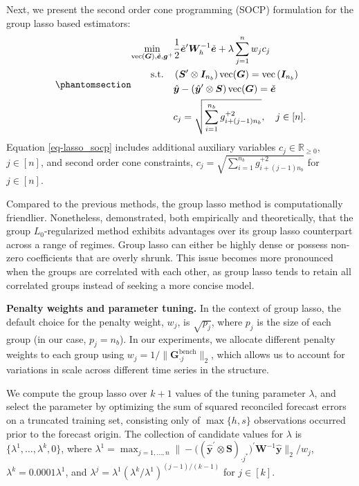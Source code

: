 \documentclass[
  11pt]{article}
\theoremstyle{plain}
\theoremstyle{remark}
\begin{document}
Next, we present the second order cone programming (SOCP) formulation
for the group lasso based estimators:
\begin{equation}\phantomsection\label{eq-lasso_socp}{
\begin{aligned}
\min_{\operatorname{vec}(\bm{G}), \check{\bm{e}}, \bm{g}^{+}} & \frac{1}{2}\check{\bm{e}}^{\prime} \bm{W}_h^{-1}\check{\bm{e}} + \lambda \sum_{j=1}^n w_j c_j \\
\text{s.t.} \quad & \left(\bm{S}^{\prime} \otimes \bm{I}_{n_b}\right) \operatorname{vec}(\bm{G})=\operatorname{vec}\left(\bm{I}_{n_b}\right) \\
& \hat{\bm{y}}-\left(\hat{\bm{y}}^{\prime} \otimes \bm{S}\right) \operatorname{vec}(\bm{G}) = \check{\bm{e}} \\
& c_j = \sqrt{\sum_{i=1}^{n_b} g_{i + (j-1) n_b}^{+2}}, \quad j \in[n].
\end{aligned}
}\end{equation} Equation \eqref{eq-lasso_socp} includes additional
auxiliary variables \(c_j \in \mathbb{R}_{\geq 0}\), \(j \in [n]\), and
second order cone constraints,
\(c_j = \sqrt{\sum_{i=1}^{n_b} g_{i + (j-1) n_b}^{+2}}\) for
\(j \in[n]\).

Compared to the previous methods, the group lasso method is
computationally friendlier. Nonetheless, \citet{Hazimeh2023-ie}
demonstrated, both empirically and theoretically, that the group
\(L_0\)-regularized method exhibits advantages over its group lasso
counterpart across a range of regimes. Group lasso can either be highly
dense or possess non-zero coefficients that are overly shrunk. This
issue becomes more pronounced when the groups are correlated with each
other, as group lasso tends to retain all correlated groups instead of
seeking a more concise model.

\textbf{Penalty weights and parameter tuning.} In the context of group
lasso, the default choice for the penalty weight, \(w_j\), is
\(\sqrt{p_j}\), where \(p_j\) is the size of each group (in our case,
\(p_j = n_b\)). In our experiments, we allocate different penalty
weights to each group using
\(w_j = 1/\|\bm{G}_{\cdot j}^{\text{bench}}\|_2\), which allows us to
account for variations in scale across different time series in the
structure.

We compute the group lasso over \(k+1\) values of the tuning parameter
\(\lambda\), and select the parameter by optimizing the sum of squared
reconciled forecast errors on a truncated training set, consisting only
of \(\max\{h, s\}\) observations occurred prior to the forecast origin.
The collection of candidate values for \(\lambda\) is
\(\{\lambda^{1},\dots,\lambda^{k}, 0\}\), where
\(\lambda^{1} = \max_{j=1, \ldots, n}\big\|-\big((\hat{\bm{y}}^{\prime} \otimes \bm{S})_{\cdot j^{*}}\big)^{\prime} \bm{W}^{-1} \hat{\bm{y}}\big\|_2 / w_j\),
\(\lambda^{k} = 0.0001\lambda^{1}\), and
\(\lambda^{j} = \lambda^{1}(\lambda^{k} / \lambda^{1})^{(j-1) / (k-1)}\)
for \(j \in [k]\).
\end{document}
